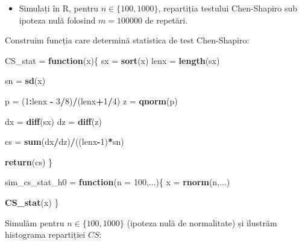 \documentclass[]{article}
\newenvironment{Shaded}{\begin{snugshade}}{\end{snugshade}}
\newcommand{\KeywordTok}[1]{\textcolor[rgb]{0.13,0.29,0.53}{\textbf{#1}}}
\newcommand{\DataTypeTok}[1]{\textcolor[rgb]{0.13,0.29,0.53}{#1}}
\newcommand{\DecValTok}[1]{\textcolor[rgb]{0.00,0.00,0.81}{#1}}
\newcommand{\StringTok}[1]{\textcolor[rgb]{0.31,0.60,0.02}{#1}}
\newcommand{\ControlFlowTok}[1]{\textcolor[rgb]{0.13,0.29,0.53}{\textbf{#1}}}
\newcommand{\OperatorTok}[1]{\textcolor[rgb]{0.81,0.36,0.00}{\textbf{#1}}}
\newcommand{\NormalTok}[1]{#1}
\newenvironment{frshaded*}{%
  \def\FrameCommand{\fboxrule=\FrameRule\fboxsep=\FrameSep \fcolorbox{framecolor}{shadecolor1}}%
  \MakeFramed {\advance\hsize-\width \FrameRestore}}%
{\endMakeFramed}
\newenvironment{rmdblock}[1]
  {\begin{frshaded*}
  \begin{itemize}
  \renewcommand{\labelitemi}{
    \raisebox{-.7\height}[0pt][0pt]{
      {\setkeys{Gin}{width=2em,keepaspectratio}\texttt{[image: images/icons/\#1]}}
    }
  }
  \item
  }
  {
  \end{itemize}
  \end{frshaded*}
  }
\newenvironment{rmdexercise}
  {\begin{rmdblock}{exercise}}
  {\end{rmdblock}}
\begin{document}
\begin{rmdexercise}
Simulați în R, pentru \(n\in\{100, 1000\}\), repartiția testului
Chen-Shapiro sub ipoteza nulă folosind \(m = 100000\) de repetări.
\end{rmdexercise}

Construim funcția care determină statistica de test Chen-Shapiro:

\begin{Shaded}
\begin{Highlighting}[]
\NormalTok{CS_stat =}\StringTok{ }\ControlFlowTok{function}\NormalTok{(x)\{}
\NormalTok{  sx =}\StringTok{ }\KeywordTok{sort}\NormalTok{(x)}
\NormalTok{  lenx =}\StringTok{ }\KeywordTok{length}\NormalTok{(sx)}
  
\NormalTok{  sn =}\StringTok{ }\KeywordTok{sd}\NormalTok{(x)}
  
\NormalTok{  p =}\StringTok{ }\NormalTok{(}\DecValTok{1}\OperatorTok{:}\NormalTok{lenx }\OperatorTok{-}\StringTok{ }\DecValTok{3}\OperatorTok{/}\DecValTok{8}\NormalTok{)}\OperatorTok{/}\NormalTok{(lenx}\OperatorTok{+}\DecValTok{1}\OperatorTok{/}\DecValTok{4}\NormalTok{)}
\NormalTok{  z =}\StringTok{ }\KeywordTok{qnorm}\NormalTok{(p)}
  
\NormalTok{  dx =}\StringTok{ }\KeywordTok{diff}\NormalTok{(sx)}
\NormalTok{  dz =}\StringTok{ }\KeywordTok{diff}\NormalTok{(z)}
  
\NormalTok{  cs =}\StringTok{ }\KeywordTok{sum}\NormalTok{(dx}\OperatorTok{/}\NormalTok{dz)}\OperatorTok{/}\NormalTok{((lenx}\OperatorTok{-}\DecValTok{1}\NormalTok{)}\OperatorTok{*}\NormalTok{sn)}
  
  \KeywordTok{return}\NormalTok{(cs)}
\NormalTok{\}}

\NormalTok{sim_cs_stat_h0 =}\StringTok{ }\ControlFlowTok{function}\NormalTok{(}\DataTypeTok{n =} \DecValTok{100}\NormalTok{,...)\{}
\NormalTok{  x =}\StringTok{ }\KeywordTok{rnorm}\NormalTok{(n,...)}
    
  \KeywordTok{CS_stat}\NormalTok{(x)}
\NormalTok{\}}
\end{Highlighting}
\end{Shaded}

Simulăm pentru \(n\in\{100, 1000\}\) (ipoteza nulă de normalitate) și
ilustrăm histograma repartiției \(CS\):
\end{document}
